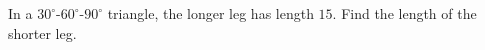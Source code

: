 In a $30^\circ$-$60^\circ$-$90^\circ$ triangle, the longer leg has length $15$. Find the length of the shorter leg.
